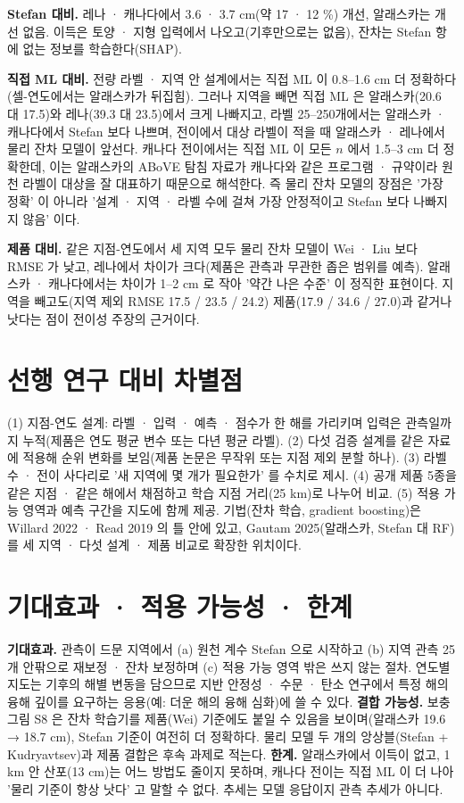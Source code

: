 \documentclass[10pt,a4paper]{article}
\begin{document}
\textbf{Stefan 대비.} 레나 · 캐나다에서 3.6 · 3.7 cm(약 17 · 12 \%) 개선, 알래스카는 개선 없음. 이득은 토양 · 지형 입력에서 나오고(기후만으로는 없음), 잔차는 Stefan 항에 없는 정보를 학습한다(SHAP).

\textbf{직접 ML 대비.} 전량 라벨 · 지역 안 설계에서는 직접 ML 이 0.8--1.6 cm 더 정확하다(셀-연도에서는 알래스카가 뒤집힘). 그러나 지역을 빼면 직접 ML 은 알래스카(20.6 대 17.5)와 레나(39.3 대 23.5)에서 크게 나빠지고, 라벨 25--250개에서는 알래스카 · 캐나다에서 Stefan 보다 나쁘며, 전이에서 대상 라벨이 적을 때 알래스카 · 레나에서 물리 잔차 모델이 앞선다. 캐나다 전이에서는 직접 ML 이 모든 $n$ 에서 1.5--3 cm 더 정확한데, 이는 알래스카의 ABoVE 탐침 자료가 캐나다와 같은 프로그램 · 규약이라 원천 라벨이 대상을 잘 대표하기 때문으로 해석한다. 즉 물리 잔차 모델의 장점은 '가장 정확' 이 아니라 '설계 · 지역 · 라벨 수에 걸쳐 가장 안정적이고 Stefan 보다 나빠지지 않음' 이다.

\textbf{제품 대비.} 같은 지점-연도에서 세 지역 모두 물리 잔차 모델이 Wei · Liu 보다 RMSE 가 낮고, 레나에서 차이가 크다(제품은 관측과 무관한 좁은 범위를 예측). 알래스카 · 캐나다에서는 차이가 1--2 cm 로 작아 '약간 나은 수준' 이 정직한 표현이다. 지역을 빼고도(지역 제외 RMSE 17.5 / 23.5 / 24.2) 제품(17.9 / 34.6 / 27.0)과 같거나 낫다는 점이 전이성 주장의 근거이다.

\section{선행 연구 대비 차별점}
(1) 지점-연도 설계: 라벨 · 입력 · 예측 · 점수가 한 해를 가리키며 입력은 관측일까지 누적(제품은 연도 평균 변수 또는 다년 평균 라벨). (2) 다섯 검증 설계를 같은 자료에 적용해 순위 변화를 보임(제품 논문은 무작위 또는 지점 제외 분할 하나). (3) 라벨 수 · 전이 사다리로 '새 지역에 몇 개가 필요한가' 를 수치로 제시. (4) 공개 제품 5종을 같은 지점 · 같은 해에서 채점하고 학습 지점 거리(25 km)로 나누어 비교. (5) 적용 가능 영역과 예측 구간을 지도에 함께 제공. 기법(잔차 학습, gradient boosting)은 Willard 2022 · Read 2019 의 틀 안에 있고, Gautam 2025(알래스카, Stefan 대 RF)를 세 지역 · 다섯 설계 · 제품 비교로 확장한 위치이다.

\section{기대효과 · 적용 가능성 · 한계}
\textbf{기대효과.} 관측이 드문 지역에서 (a) 원천 계수 Stefan 으로 시작하고 (b) 지역 관측 25개 안팎으로 재보정 · 잔차 보정하며 (c) 적용 가능 영역 밖은 쓰지 않는 절차. 연도별 지도는 기후의 해별 변동을 담으므로 지반 안정성 · 수문 · 탄소 연구에서 특정 해의 융해 깊이를 요구하는 응용(예: 더운 해의 융해 심화)에 쓸 수 있다. \textbf{결합 가능성.} 보충 그림 S8 은 잔차 학습기를 제품(Wei) 기준에도 붙일 수 있음을 보이며(알래스카 19.6 → 18.7 cm), Stefan 기준이 여전히 더 정확하다. 물리 모델 두 개의 앙상블(Stefan + Kudryavtsev)과 제품 결합은 후속 과제로 적는다. \textbf{한계.} 알래스카에서 이득이 없고, 1 km 안 산포(13 cm)는 어느 방법도 줄이지 못하며, 캐나다 전이는 직접 ML 이 더 나아 '물리 기준이 항상 낫다' 고 말할 수 없다. 추세는 모델 응답이지 관측 추세가 아니다.
\end{document}
